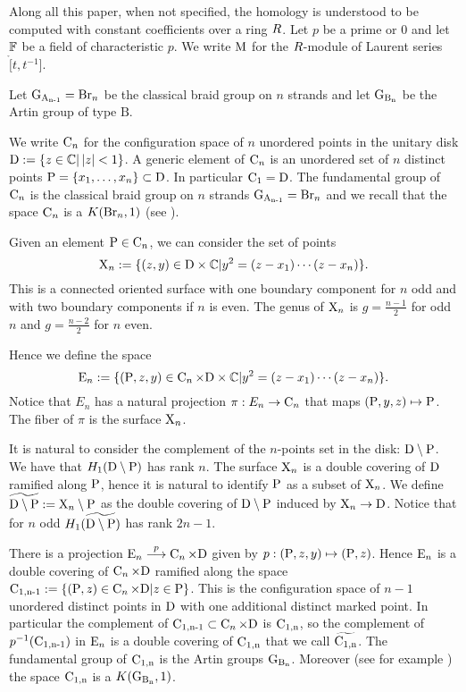 
Along all this paper, when not specified, the homology is understood to be computed with constant coefficients over a ring $\ring$. 
Let $p$ be a prime or $0$ and let $\F$ be a field of characteristic $p$. 
We write $\md$ for the $\ring$-module of Laurent series $\ring[t, t^{-1}] $. 


Let $\Ga{n-1}  = \Br_n$ be the classical braid group on $n$ strands and let $\Gb{n}$ be the 
Artin group of type $\mathrm{B}$.

We write $\confn$ for the configuration space of $n$ unordered points in the unitary disk  $\disk:= \{z \in \C | \, |z|  < 1\}$.
A generic element of $\confn$ is an unordered set of $n$ distinct points $\P = \{x_1, \ldots, x_n\} \subset \disk$. In particular $\conf_1 = \disk$. The fundamental group of $\conf_n$ is the classical braid group on $n$ strands $\Ga{n-1}  = \Br_n$ and we recall that the space $\conf_n$ is a $K(\Br_n,1)$ (see \cite{fa_neu_62}).

Given an element $\P \in \confn$, we can consider the set of points $$\surf_n:= \{(z,y) \in  \disk \times \C | y^2 = (z-x_1)\cdots(z-x_n) \}.$$ This is a connected oriented surface with one boundary component for $n$ odd and with two boundary components if $n$ is even. The genus of $\surf_n$ is $g = \frac{n-1}{2}$ for odd $n$ and $g = \frac{n-2}{2}$ for $n$ even.

Hence we define the space
$$
\totsp_n := \{(\P, z,y ) \in \conf_n  \times \disk \times \C| y^2 = (z-x_1)\cdots(z-x_n) \}.
$$
Notice that $E_n$ has a natural projection $\pi:E_n\to \conf_n$ that maps $(\P, y, z) \mapsto \P$. The fiber of $\pi$ is the surface $\surf_n$.

It is natural to consider the complement of the $n$-points set in the disk: $\disk \setminus \P$. We have that $H_1(\disk \setminus \P)$ has rank $n$. The surface $\surf_n$ is a double covering of $\disk$ ramified along $\P$, hence it is natural to identify $\P$ as a subset of $\surf_n$. 
We define $\ddiskP:= \surf_n \setminus \P$ as the double covering of $\disk \setminus \P$ induced by $\surf_n \to \disk$.
Notice that for $n$ odd $H_1(\ddiskP)$ has rank $2n-1$. 

There is a projection 
$\totsp_n \stackrel{p}{\longrightarrow} \conf_n \times \disk 
$ given by $p:(\P,z,y) \mapsto (\P, z)$.
Hence $\totsp_n$ is a double covering of $\conf_n \times \disk$ ramified along the space $\confm{n-1} := \{ (\P, z) \in \conf_n \times \disk | z \in \P\}$. This is the configuration space of $n-1$ unordered distinct points in $\disk$ with one additional distinct marked point. In particular the complement of
$\confm{n-1} \subset \conf_n \times \disk$ is $\confm{n}$, so the complement of
$p^{-1}(\confm{n-1})$ in $\totsp_n$ is a double covering of $\confm{n}$ that we call $\confmd{n}$.
The fundamental group of $\confm{n}$ is the Artin groups $\Gb{n}$. Moreover (see for example \cite{bri_73}) the space $\confm{n}$ is a $K(\Gbn,1)$.

